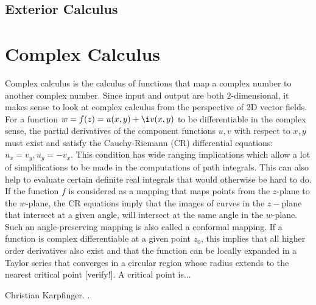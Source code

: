 \documentclass[12pt]{article}  %
\begin{document}
\subsection{Exterior Calculus}  



\section{Complex Calculus}
Complex calculus is the calculus of functions that map a complex number to another complex number. Since input and output are both 2-dimensional, it makes sense to look at complex calculus from the perspective of 2D vector fields. For a function $w = f(z) = u(x,y) + \i v(x,y)$ to be differentiable in the complex sense, the partial derivatives of the component functions $u,v$ with respect to $x,y$ must exist and satisfy the Cauchy-Riemann (CR) differential equations: $u_x = v_y, u_y = -v_x$. This condition has wide ranging implications which allow a lot of simplifications to be made in the computations of path integrals. This can also help to evaluate certain definite real integrals that would otherwise be hard to do. If the function $f$ is considered as a mapping that maps points from the $z$-plane to the $w$-plane, the CR equations imply that the images of curves in the $z-$plane that intersect at a given angle, will intersect at the same angle in the $w$-plane. Such an angle-preserving mapping is also called a conformal mapping. If a function is complex differentiable at a given point $z_0$, this implies that all higher order derivatives also exist and that the function can be locally expanded in a Taylor series that converges in a circular region whose radius extends to the nearest critical point [verify!]. A critical point is...




\begin{thebibliography}{10}
Christian Karpfinger. .
\end{thebibliography}	

 
  
	
\end{document}
